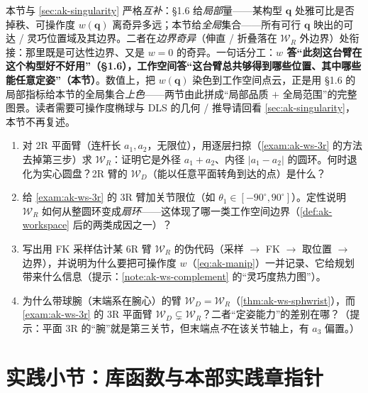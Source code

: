 \begin{note}\label{note:ak-ws-complement}
本节与 \cref{sec:ak-singularity} 严格\emph{互补}：§1.6 给\emph{局部}量——某构型 $\mathbf{q}$ 处雅可比是否掉秩、可操作度 $w(\mathbf{q})$ 离奇异多远；本节给\emph{全局}集合——所有可行 $\mathbf{q}$ 映出的可达 / 灵巧位置域及其边界。二者在\emph{边界奇异}（伸直 / 折叠落在 $\mathcal{W}_R$ 外边界）处衔接：那里既是可达性边界、又是 $w=0$ 的奇异。一句话分工：\textbf{$w$ 答“此刻这台臂在这个构型好不好用”（§1.6），工作空间答“这台臂总共够得到哪些位置、其中哪些能任意定姿”（本节）}。数值上，把 $w(\mathbf{q})$ 染色到工作空间点云，正是用 §1.6 的局部指标给本节的全局集合\emph{上色}——两节由此拼成“局部品质 $+$ 全局范围”的完整图景。读者需要可操作度椭球与 DLS 的几何 / 推导请回看 \cref{sec:ak-singularity}，本节不再复述。
\end{note}

\begin{practice}
\begin{enumerate}
  \item 对 2R 平面臂（连杆长 $a_1,a_2$，无限位），用逐层扫掠（\cref{exam:ak-ws-3r} 的方法去掉第三步）求 $\mathcal{W}_R$：证明它是外径 $a_1+a_2$、内径 $|a_1-a_2|$ 的圆环。何时退化为实心圆盘？2R 臂的 $\mathcal{W}_D$（能以任意平面转角到达的点）是什么？
  \item 给 \cref{exam:ak-ws-3r} 的 3R 臂加关节限位（如 $\theta_1\in[-90^\circ,90^\circ]$）。定性说明 $\mathcal{W}_R$ 如何从整圆环变成\emph{扇环}——这体现了哪一类工作空间边界（\cref{def:ak-workspace} 后的两类成因之一）？
  \item 写出用 FK 采样估计某 6R 臂 $\mathcal{W}_R$ 的伪代码（采样 $\to$ FK $\to$ 取位置 $\to$ 边界），并说明为什么要把可操作度 $w$（\cref{eq:ak-manip}）一并记录、它给规划带来什么信息（提示：\cref{note:ak-ws-complement} 的“灵巧度热力图”）。
  \item 为什么带球腕（末端系在腕心）的臂 $\mathcal{W}_D=\mathcal{W}_R$（\cref{thm:ak-ws-sphwrist}），而 \cref{exam:ak-ws-3r} 的 3R 平面臂 $\mathcal{W}_D\subsetneq\mathcal{W}_R$？二者“定姿能力”的差别在哪？（提示：平面 3R 的“腕”就是第三关节，但末端点\emph{不}在该关节轴上，有 $a_3$ 偏置。）
\end{enumerate}
\end{practice}

\section{实践小节：库函数与本部实践章指针}
\label{sec:ak-practice}

